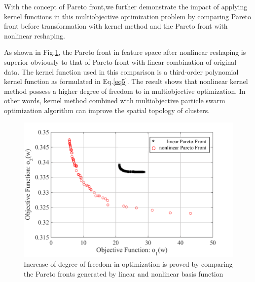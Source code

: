 With the concept of Pareto front,we further demonstrate the impact of applying kernel functions in this multiobjective optimization problem by comparing Pareto front before transformation with kernel method and the Pareto front with nonlinear reshaping. %


As shown in Fig.\ref{fig:pareto_compare}, the Pareto front in feature space after nonlinear reshaping is superior obviously to that of Pareto front with linear combination of original data. The kernel function used in this comparison is a third-order polynomial kernel function as formulated in Eq.\ref{eq5}. The result shows that nonlinear kernel method possess a higher degree of freedom to in multiobjective optimization. In other words, kernel method combined with multiobjective particle swarm optimization algorithm can improve the spatial topology of clusters.

\begin{figure}[t]
\centering
\includegraphics[scale=.6]{Fig/pareto_compare.pdf}
\caption{Increase of degree of freedom in optimization is proved by comparing the Pareto fronts generated by linear and nonlinear basis function}
\label{fig:pareto_compare}
\end{figure}

